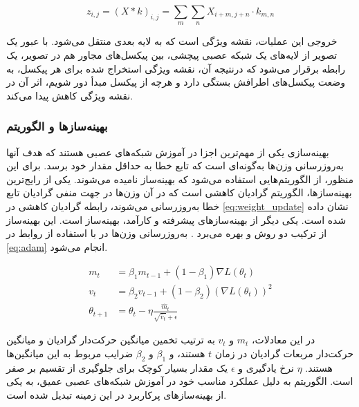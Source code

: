 \begin{latin}
\begin{equation}
\label{eq:convolution}
z_{i,j} = (X * k)_{i,j} = \sum_{m}\sum_{n} X_{i+m,j+n} \cdot k_{m,n}
\end{equation}
\end{latin}

خروجی این عملیات، نقشه ویژگی
 است که به لایه بعدی منتقل می‌شود. با عبور یک تصویر از لایه‌های یک شبکه عصبی پیچشی، بین پیکسل‌های مجاور هم در تصویر، یک رابطه برقرار می‌شود که درنتیجه آن، نقشه ویژگی استخراج شده برای هر پیکسل،‌ به وضعت پیکسل‌های اطرافش بستگی دارد و هرچه از پیکسل مبدأ دور شویم، اثر آن در نقشه ویژگی کاهش پیدا می‌کند.
 
 

\subsubsection{بهینه‌سازها و الگوریتم 
}

بهینه‌سازی یکی از مهم‌ترین اجزا در آموزش شبکه‌های عصبی هستند که هدف آنها به‌روزرسانی وزن‌ها به‌گونه‌ای است که تابع خطا به حداقل مقدار خود برسد. برای این منظور، از الگوریتم‌هایی استفاده می‌شود که بهینه‌ساز نامیده می‌شوند. 
یکی از رایج‌ترین بهینه‌سازها، الگوریتم گرادیان کاهشی است که در آن وزن‌ها در جهت منفی گرادیان تابع خطا به‌روزرسانی می‌شوند، رابطه گرادیان کاهشی در \autoref{eq:weight_update} نشان داده شده است. 
 یکی دیگر از بهینه‌سازهای پیشرفته و کارآمد، بهینه‌ساز 
 است. این بهینه‌ساز از ترکیب دو روش
 و
 بهره می‌برد 
 \cite{towardsdatascienceUnderstandingDeep,mediumMomentumRMSpropAdam}.
  به‌روزرسانی وزن‌ها در  با استفاده از روابط در 
  \autoref{eq:adam}
  انجام می‌شود.

\begin{latin}
\begin{equation}
\label{eq:adam}
\begin{aligned}
m_t &= \beta_1 m_{t-1} + (1 - \beta_1) \nabla L(\theta_t)\\
v_t &= \beta_2 v_{t-1} + (1 - \beta_2) (\nabla L(\theta_t))^2\\
\theta_{t+1} &= \theta_t - \eta \frac{\hat{m}_t}{\sqrt{\hat{v}_t} + \epsilon}
\end{aligned}
\end{equation}
\end{latin}


در این معادلات، \(m_t\) و \(v_t\) به ترتیب تخمین میانگین حرکت‌دار گرادیان و میانگین حرکت‌دار مربعات گرادیان در زمان \(t\) هستند، و \(\beta_1\) و \(\beta_2\) ضرایب مربوط به این میانگین‌ها هستند. \(\eta\) نرخ یادگیری و \(\epsilon\) یک مقدار بسیار کوچک برای جلوگیری از تقسیم بر صفر است. الگوریتم
به دلیل عملکرد مناسب خود در آموزش شبکه‌های عصبی عمیق، به یکی از بهینه‌سازهای پرکاربرد در این زمینه تبدیل شده است.


